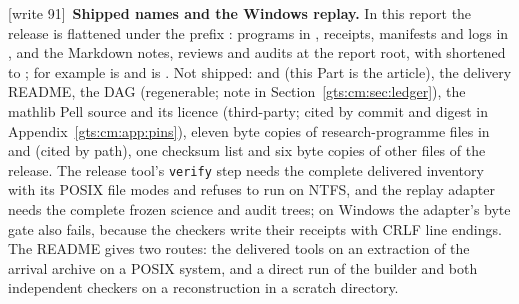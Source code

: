 \documentclass[11pt,letterpaper]{article}
\theoremstyle{definition}
\theoremstyle{remark}
\newcommand{\wtagd}{\textup{[write 91]}}
\begin{document}
\wtagd\ \textbf{Shipped names and the Windows replay.} In this report the release is flattened under the prefix : programs in , receipts, manifests and logs in , and the Markdown notes, reviews and audits at the report root, with  shortened to ; for example  is  and  is . Not shipped:  and  (this Part is the article), the delivery README, the DAG (regenerable; note in Section~\ref{gts:cm:sec:ledger}), the mathlib Pell source and its licence (third-party; cited by commit and digest in Appendix~\ref{gts:cm:app:pins}), eleven byte copies of research-programme files in  and  (cited by path), one checksum list and six byte copies of other files of the release. The release tool's \texttt{verify} step needs the complete delivered inventory with its POSIX file modes and refuses to run on NTFS, and the replay adapter needs the complete frozen science and audit trees; on Windows the adapter's byte gate also fails, because the checkers write their receipts with CRLF line endings. The README gives two routes: the delivered tools on an extraction of the arrival archive on a POSIX system, and a direct run of the builder and both independent checkers on a reconstruction in a scratch directory.
\end{document}
